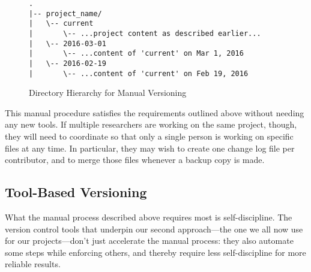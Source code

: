 \documentclass[10pt]{article}
\begin{document}
\begin{figure}
\begin{verbatim}
.
|-- project_name/
|   \-- current
|       \-- ...project content as described earlier...
|   \-- 2016-03-01
|       \-- ...content of 'current' on Mar 1, 2016
|   \-- 2016-02-19
|       \-- ...content of 'current' on Feb 19, 2016
\end{verbatim}
\caption{Directory Hierarchy for Manual Versioning}
\label{fig:manual}
\end{figure}

This manual procedure satisfies the requirements outlined above
without needing any new tools. If multiple researchers are working on
the same project, though, they will need to coordinate so that only a
single person is working on specific files at any time. In particular,
they may wish to create one change log file per contributor, and to
merge those files whenever a backup copy is made.

\subsection*{Tool-Based Versioning}

What the manual process described above requires most is
self-discipline. The version control tools that underpin our second
approach---the one we all now use for our projects---don't just
accelerate the manual process: they also automate some steps while
enforcing others, and thereby require less self-discipline for more
reliable results.
\end{document}
